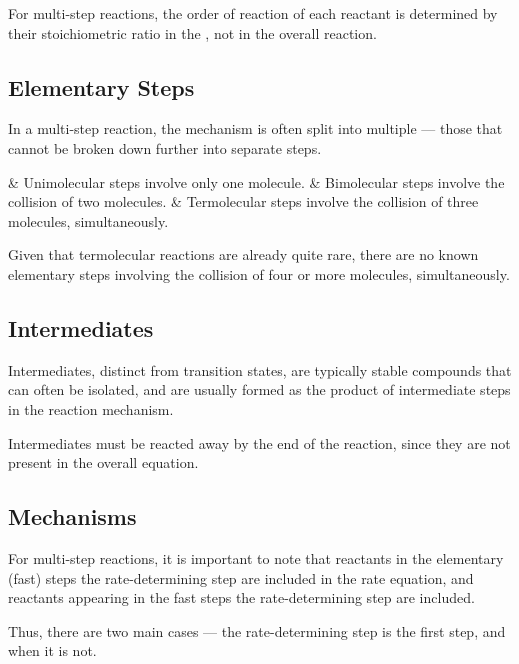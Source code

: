 		For multi-step reactions, the order of reaction of each reactant is determined by their stoichiometric ratio in the
		, not in the overall reaction.

		\subsection{Elementary Steps}

			In a multi-step reaction, the mechanism is often split into multiple  --- those that cannot be broken down
			further into separate steps.

			\begin{bulletlist}
				& Unimolecular steps involve only one molecule.
				& Bimolecular steps involve the collision of two molecules.
				& Termolecular steps involve the collision of three molecules, simultaneously.
			\end{bulletlist}

			Given that termolecular reactions are already quite rare, there are no known elementary steps involving the collision of four or
			more molecules, simultaneously.



		\subsection{Intermediates}

			Intermediates, distinct from transition states, are typically stable compounds that can often be isolated, and are usually formed
			as the product of intermediate steps in the reaction mechanism.

			Intermediates must be reacted away by the end of the reaction, since they are not present in the overall equation.



		\pagebreak
		\subsection{Mechanisms}

			For multi-step reactions, it is important to note that reactants in the elementary (fast) steps  the
			rate-determining step are included in the rate equation, and reactants appearing in the fast steps  the
			rate-determining step are  included.

			Thus, there are two main cases --- the rate-determining step is the first step, and when it is not.


